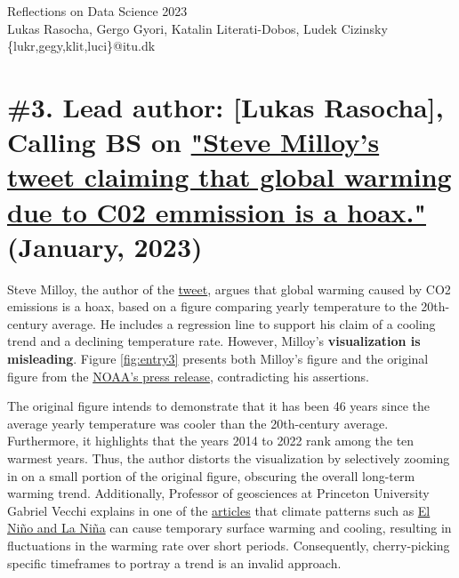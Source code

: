 \documentclass[fleqn,12pt]{article}
\begin{document}
\setlength{\baselineskip}{1.15\baselineskip}



\begin{center}
  {\Huge Reflections on Data Science 2023}\\[2ex]
  {Lukas Rasocha, Gergo Gyori, Katalin Literati-Dobos, Ludek Cizinsky}\\
  [2ex]
  {\{lukr,gegy,klit,luci\}@itu.dk}\\[2ex]
\end{center}

\tableofcontents




\parindent=20pt 
\parskip=0mm

\newpage

\section{\#3. Lead author: [Lukas Rasocha], Calling BS on \href{https://twitter.com/JunkScience/status/1613724250011242497?s=20}{"Steve Milloy's tweet claiming that global warming due to C02 emmission is a hoax."} (January, 2023)} 

Steve Milloy, the author of the \href{https://twitter.com/JunkScience/status/1613724250011242497?s=20}{tweet}, argues that global warming caused by CO2 emissions is a hoax, 
based on a figure comparing yearly temperature to the 20th-century average. He includes a regression line to support his claim of a cooling trend and a declining temperature rate. 
However, Milloy's \textbf{visualization is misleading}. Figure \ref{fig:entry3} presents both Milloy's figure and the original figure from the \href{https://www.noaa.gov/news/2022-was-worlds-6th-warmest-year-on-record}{NOAA's press release}, 
contradicting his assertions.

The original figure intends to demonstrate that it has been 46 years since the average yearly temperature was cooler than the 20th-century average. 
Furthermore, it highlights that the years 2014 to 2022 rank among the ten warmest years. Thus, the author distorts the visualization by selectively zooming in on a small portion of the original figure, obscuring the overall long-term warming trend. 
Additionally, Professor of geosciences at Princeton University Gabriel Vecchi explains in one of the \href{https://www.factcheck.org/2023/01/scicheck-viral-tweet-misrepresents-noaa-report-on-rising-global-temperature/}{articles} 
that climate patterns such as \href{https://oceanservice.noaa.gov/facts/ninonina.html}{El Niño and La Niña} can cause temporary surface warming and cooling, resulting in fluctuations in the warming rate over short periods. 
Consequently, cherry-picking specific timeframes to portray a trend is an invalid approach.
\end{document}
